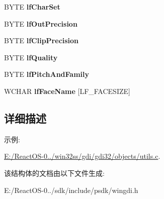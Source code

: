 \begin{DoxyCompactItemize}
B\+Y\+TE {\bfseries lf\+Char\+Set}
\item 
\mbox{\label{structtag_l_o_g_f_o_n_t_w_a127aaf91a023ce889e5ff95d2d354bed}} 
B\+Y\+TE {\bfseries lf\+Out\+Precision}
\item 
\mbox{\label{structtag_l_o_g_f_o_n_t_w_ad46dd44f98e2b0beeab12afab51f2778}} 
B\+Y\+TE {\bfseries lf\+Clip\+Precision}
\item 
\mbox{\label{structtag_l_o_g_f_o_n_t_w_a6378f3329c5a546955a672105df8bf31}} 
B\+Y\+TE {\bfseries lf\+Quality}
\item 
\mbox{\label{structtag_l_o_g_f_o_n_t_w_aee0b40d69635f73372a85227e5b3bb92}} 
B\+Y\+TE {\bfseries lf\+Pitch\+And\+Family}
\item 
\mbox{\label{structtag_l_o_g_f_o_n_t_w_a67077cc2f2f6cd6ab74d545b3ca6d733}} 
W\+C\+H\+AR {\bfseries lf\+Face\+Name} \mbox{[}L\+F\+\_\+\+F\+A\+C\+E\+S\+I\+ZE\mbox{]}
\end{DoxyCompactItemize}


\subsection{详细描述}
\begin{Desc}
\item[示例\+: ]\par
\hyperlink{_e_1_2_react_o_s-0_84_86_2win32ss_2gdi_2gdi32_2objects_2utils_8c-example}{E\+:/\+React\+O\+S-\/0../win32ss/gdi/gdi32/objects/utils.\+c}.\end{Desc}


该结构体的文档由以下文件生成\+:\begin{DoxyCompactItemize}
\item 
E\+:/\+React\+O\+S-\/0../sdk/include/psdk/wingdi.\+h\end{DoxyCompactItemize}
